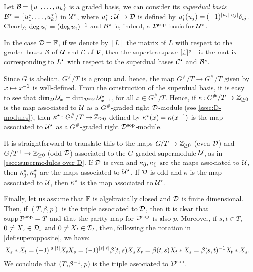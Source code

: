 \begin{defi}
    Let $\mathcal B = \{u_1, \ldots, u_k\}$ is a graded basis, we can consider its \emph{superdual basis} $\mathcal B^\star = \{u_1^\star, \ldots, u_k^\star\}$ in $\mathcal U^\star$, where $u_i^\star : \mathcal U \rightarrow \mathcal{D}$ is defined by $u_i^\star (u_j) = (-1)^{|u_i||u_j|} \delta_{ij}$. 
    Clearly, $\deg u_i^\star = (\deg u_i)^{-1}$ and $\mathcal B^\star$ is, indeed, a $\mathcal{D}^{\mathrm{sop}}$-basis for $\mathcal U^\star$.
\end{defi}

\begin{remark}
	In the case $\mathcal{D}=\mathbb{F}$, if we denote by $[L]$ the matrix of $L$ with respect to the graded bases $\mathcal B$ of $\mathcal U$ and $\mathcal C$ of $\mathcal V$, then the supertranspose $[L]^{s\top}$ is the matrix corresponding to $L^\star$ with respect to the superdual bases $\mathcal C^\star$ and $\mathcal B^\star$.
\end{remark}

Since $G$ is abelian, $G^\#/T$ is a group and, hence, the map $G^\#/T \to G^\#/T$ given by $x \mapsto x^{-1}$ is well-defined. 
From the construction of the superdual basis, it is easy to see that $\dim_{\mathcal{D}} \mathcal U_x = \dim_{\mathcal{D}^{\mathrm{sop}}} \mathcal U^\star_{x^{-1}}$, for all $x \in G^\#/T$. 
Hence, if $\kappa\colon G^\#/T \to \mathbb{Z}_{\geq 0}$ is the map associated to $\mathcal U$ as a $G^\#$-graded right $\mathcal{D}$-module (see \cref{ssec:D-modules}), then $\kappa^\star \colon G^\#/T \to \mathbb{Z}_{\geq 0}$ defined by $\kappa^\star (x) = \kappa (x^{-1})$ is the map associated to $\mathcal U^\star$ as a $G^\#$-graded right $\mathcal{D}^{\mathrm{sop}}$-module.

It is straightforward to translate this to the maps $G/T \to \mathbb{Z}_{\geq 0}$ (even $\mathcal{D}$) and $G/T^+ \to \mathbb{Z}_{\geq 0}$ (odd $\mathcal{D}$) associated to the $G$-graded supermodule $\mathcal U$, as in \cref{ssec:supermodules-over-D}. 
If $\mathcal{D}$ is even and $\kappa_{\bar{0}}, \kappa_{\bar{1}}$ are the maps associated to $\mathcal U$, then $\kappa_{\bar{0}}^\star, \kappa_{\bar{1}}^\star$ are the maps associated to $\mathcal U^\star$. 
If $\mathcal{D}$ is odd and $\kappa$ is the map associated to $\mathcal U$, then $\kappa^\star$ is the map associated to $\mathcal U^\star$.

Finally, let us assume that $\mathbb{F}$ is algebraically closed and $\mathcal{D}$ is finite dimensional. 
Then, if $(T, \beta, p)$ is the triple associated to $\mathcal{D}$, then it is clear that $\operatorname{supp} \mathcal{D}^{\mathrm{sop}} = T$ and that the parity map for $\mathcal{D}^{\mathrm{sop}}$ is also $p$. 
Moreover, if $s,t \in T$, $0 \neq X_s \in \mathcal{D}_s$ and $0 \neq X_t \in \mathcal{D}_t$, then, following the notation in \cref{def:superopposite}, we have:
\[
    X_s * X_t = (-1)^{|s||t|} X_tX_s = (-1)^{|s||t|} \beta(t, s) X_sX_t = \beta(t, s) X_t*X_s = \beta(s, t)^{-1} X_t*X_s.
\]
We conclude that $(T,\beta^{-1}, p)$ is the triple associated to $\mathcal{D}^{\mathrm{sop}}$.